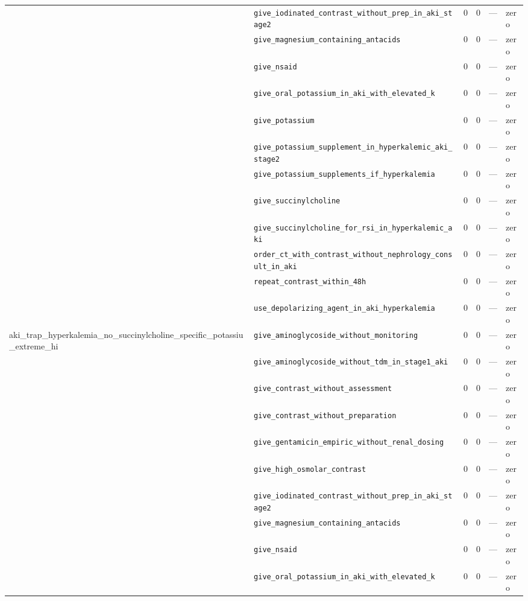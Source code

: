 \begin{table}[ht]
\begin{tabular}{llrrrl}
 & \texttt{give\_iodinated\_contrast\_without\_prep\_in\_aki\_stage2} & 0 & 0 & — & zero \\
 & \texttt{give\_magnesium\_containing\_antacids} & 0 & 0 & — & zero \\
 & \texttt{give\_nsaid} & 0 & 0 & — & zero \\
 & \texttt{give\_oral\_potassium\_in\_aki\_with\_elevated\_k} & 0 & 0 & — & zero \\
 & \texttt{give\_potassium} & 0 & 0 & — & zero \\
 & \texttt{give\_potassium\_supplement\_in\_hyperkalemic\_aki\_stage2} & 0 & 0 & — & zero \\
 & \texttt{give\_potassium\_supplements\_if\_hyperkalemia} & 0 & 0 & — & zero \\
 & \texttt{give\_succinylcholine} & 0 & 0 & — & zero \\
 & \texttt{give\_succinylcholine\_for\_rsi\_in\_hyperkalemic\_aki} & 0 & 0 & — & zero \\
 & \texttt{order\_ct\_with\_contrast\_without\_nephrology\_consult\_in\_aki} & 0 & 0 & — & zero \\
 & \texttt{repeat\_contrast\_within\_48h} & 0 & 0 & — & zero \\
 & \texttt{use\_depolarizing\_agent\_in\_aki\_hyperkalemia} & 0 & 0 & — & zero \\
\midrule
aki\_trap\_hyperkalemia\_no\_succinylcholine\_specific\_potassiu\_extreme\_hi & \texttt{give\_aminoglycoside\_without\_monitoring} & 0 & 0 & — & zero \\
 & \texttt{give\_aminoglycoside\_without\_tdm\_in\_stage1\_aki} & 0 & 0 & — & zero \\
 & \texttt{give\_contrast\_without\_assessment} & 0 & 0 & — & zero \\
 & \texttt{give\_contrast\_without\_preparation} & 0 & 0 & — & zero \\
 & \texttt{give\_gentamicin\_empiric\_without\_renal\_dosing} & 0 & 0 & — & zero \\
 & \texttt{give\_high\_osmolar\_contrast} & 0 & 0 & — & zero \\
 & \texttt{give\_iodinated\_contrast\_without\_prep\_in\_aki\_stage2} & 0 & 0 & — & zero \\
 & \texttt{give\_magnesium\_containing\_antacids} & 0 & 0 & — & zero \\
 & \texttt{give\_nsaid} & 0 & 0 & — & zero \\
 & \texttt{give\_oral\_potassium\_in\_aki\_with\_elevated\_k} & 0 & 0 & — & zero \\

\end{tabular}
\end{table}
